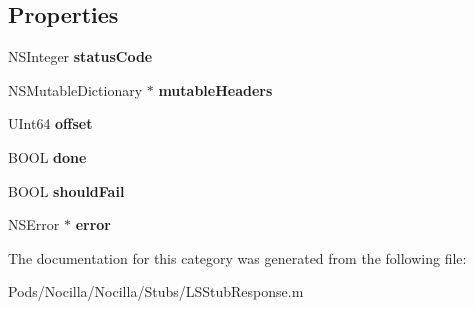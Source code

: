 \subsection*{Properties}
\begin{DoxyCompactItemize}
\item 
\hypertarget{category_l_s_stub_response_07_08_a0809fc238562342d1c0a9d38994cb724}{N\-S\-Integer {\bfseries status\-Code}}\label{category_l_s_stub_response_07_08_a0809fc238562342d1c0a9d38994cb724}

\item 
\hypertarget{category_l_s_stub_response_07_08_a6790a0ececce18667c05a7e32739b0fe}{N\-S\-Mutable\-Dictionary $\ast$ {\bfseries mutable\-Headers}}\label{category_l_s_stub_response_07_08_a6790a0ececce18667c05a7e32739b0fe}

\item 
\hypertarget{category_l_s_stub_response_07_08_a88e973e1dfd3c5852b40ec4aaca39233}{U\-Int64 {\bfseries offset}}\label{category_l_s_stub_response_07_08_a88e973e1dfd3c5852b40ec4aaca39233}

\item 
\hypertarget{category_l_s_stub_response_07_08_a5a7fd2f54d5fe9a5012c8bb5fbf5410b}{B\-O\-O\-L {\bfseries done}}\label{category_l_s_stub_response_07_08_a5a7fd2f54d5fe9a5012c8bb5fbf5410b}

\item 
\hypertarget{category_l_s_stub_response_07_08_ab9990611ee054fac567198b916311153}{B\-O\-O\-L {\bfseries should\-Fail}}\label{category_l_s_stub_response_07_08_ab9990611ee054fac567198b916311153}

\item 
\hypertarget{category_l_s_stub_response_07_08_a1bc145ef396d0d5b4fa6bbece54537e0}{N\-S\-Error $\ast$ {\bfseries error}}\label{category_l_s_stub_response_07_08_a1bc145ef396d0d5b4fa6bbece54537e0}

\end{DoxyCompactItemize}


The documentation for this category was generated from the following file\-:\begin{DoxyCompactItemize}
\item 
Pods/\-Nocilla/\-Nocilla/\-Stubs/L\-S\-Stub\-Response.\-m\end{DoxyCompactItemize}
